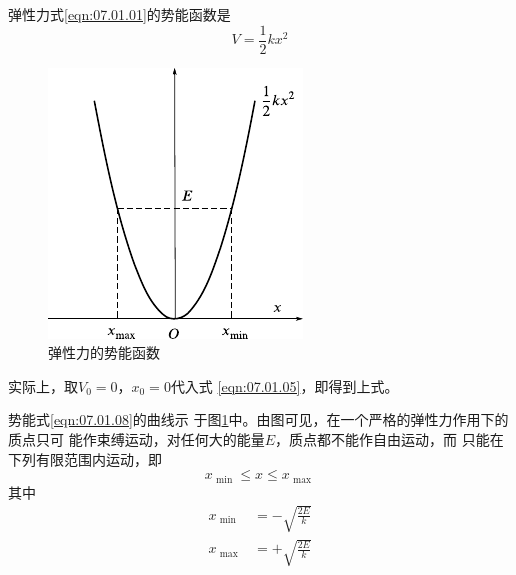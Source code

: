 弹性力\lhbrak 式\eqref{eqn:07.01.01}\rhbrak 的势能函数是
\begin{equation}\label{eqn:07.01.08}
  V = \frac { 1 } { 2 } k x ^ { 2 }
\end{equation}
\begin{figure}
  \centering
  \includegraphics{figure/fig07.04}
  \caption{弹性力的势能函数}
  \label{fig:07.04}
\end{figure}
实际上，取$  V _ { 0 } = 0   $，$  x _ { 0 } = 0   $代入式
\eqref{eqn:07.01.05}，即得到上式。

势能\lhbrak 式\eqref{eqn:07.01.08}\rhbrak 的曲线示
于图\ref{fig:07.04}\;中。由图可见，在一个严格的弹性力作用下的质点只可
能作束缚运动，对任何大的能量$ E $，质点都不能作自由运动，而
只能在下列有限范围内运动，即
{\setlength{\mathindent}{4em}
\begin{equation*}
  x _ { \text { min } } \leqslant x \leqslant x _ { \text { max } }
\end{equation*}
其中\vspace{-1.56em}
\begin{equation*}
  \begin{split}
      x _ { \text { min } } &= - \sqrt { \frac { 2 E } { k } } \\
  x _ { \text { max } } &= + \sqrt { \frac { 2 E } { k } }
  \end{split}
\end{equation*}}
\vspace{-2em}
